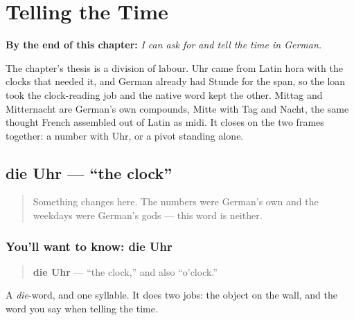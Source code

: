 
\chapter{Telling the Time}
\label{ch:time}

\begin{chapteropening}
\textbf{By the end of this chapter:} \emph{I can ask for and tell the time in German.}

The chapter's thesis is a division of labour. Uhr came from Latin hora with the clocks that needed it, and German already had Stunde for the span, so the loan took the clock-reading job and the native word kept the other. Mittag and Mitternacht are German's own compounds, Mitte with Tag and Nacht, the same thought French assembled out of Latin as midi. It closes on the two frames together: a number with Uhr, or a pivot standing alone.
\end{chapteropening}

\section[die Uhr]{die Uhr — \textquotedblleft{}the clock\textquotedblright{}}

\label{lesson:GE-C08-uhr}



\begin{quote}
Something changes here. The numbers were German's own and the weekdays were German's gods — this word is neither.
\end{quote}

\subsection*{You'll want to know: die Uhr}
\begin{quote}
\textbf{die Uhr} — \textquotedblleft{}the clock,\textquotedblright{} and also \textquotedblleft{}o'clock.\textquotedblright{}
\end{quote}

A \emph{die}-word, and one syllable. It does two jobs: the object on the wall, and the word you say when telling the time.

